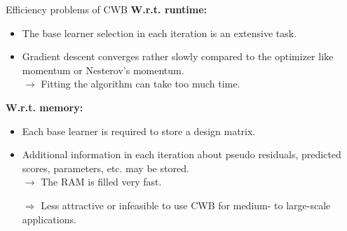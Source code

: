 \documentclass[t,10pt]{beamer}
\begin{document}
\begin{frame}{Efficiency problems of CWB}
    \textbf{W.r.t. runtime:}
    \begin{itemize}
        \item 
            The base learner selection in each iteration is an extensive task.%
        \item
            Gradient descent converges rather slowly compared to the optimizer like momentum or Nesterov's momentum.\\[0.2cm]
            $\rightarrow$ Fitting the algorithm can take too much time.
    \end{itemize}
    \textbf{W.r.t. memory:}  
    \begin{itemize}
    \item 
        Each base learner is required to store a design matrix.
    \item 
        Additional information in each iteration about pseudo residuals, predicted scores, parameters, etc. may be stored.\\[0.2cm]
        $\rightarrow$ The RAM is filled very fast.
  \end{itemize}
  \begin{itemize}
    \item[$\Rightarrow$] Less attractive or infeasible to use CWB for medium- to large-scale applications.
  \end{itemize}
\end{frame}
\end{document}
